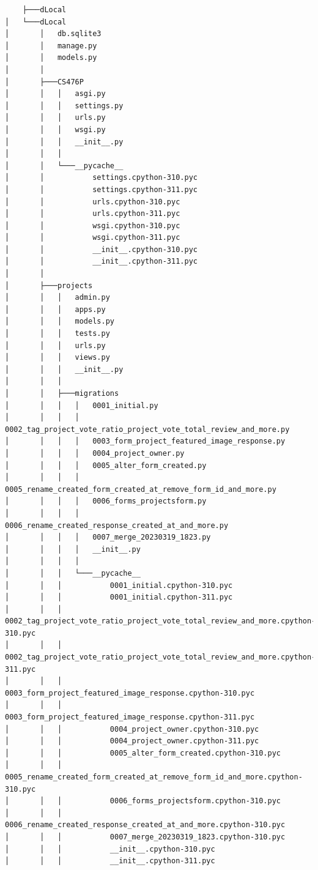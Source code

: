 \documentclass[letterpaper, 12 pt, conference]{ieeeconf}
\begin{document}
\singlespacing
\begin{lstlisting}
    ├───dLocal
│   └───dLocal
│       │   db.sqlite3
│       │   manage.py
│       │   models.py
│       │
│       ├───CS476P
│       │   │   asgi.py
│       │   │   settings.py
│       │   │   urls.py
│       │   │   wsgi.py
│       │   │   __init__.py
│       │   │
│       │   └───__pycache__
│       │           settings.cpython-310.pyc
│       │           settings.cpython-311.pyc
│       │           urls.cpython-310.pyc
│       │           urls.cpython-311.pyc
│       │           wsgi.cpython-310.pyc
│       │           wsgi.cpython-311.pyc
│       │           __init__.cpython-310.pyc
│       │           __init__.cpython-311.pyc
│       │
│       ├───projects
│       │   │   admin.py
│       │   │   apps.py
│       │   │   models.py
│       │   │   tests.py
│       │   │   urls.py
│       │   │   views.py
│       │   │   __init__.py
│       │   │
│       │   ├───migrations
│       │   │   │   0001_initial.py
│       │   │   │   0002_tag_project_vote_ratio_project_vote_total_review_and_more.py
│       │   │   │   0003_form_project_featured_image_response.py
│       │   │   │   0004_project_owner.py
│       │   │   │   0005_alter_form_created.py
│       │   │   │   0005_rename_created_form_created_at_remove_form_id_and_more.py
│       │   │   │   0006_forms_projectsform.py
│       │   │   │   0006_rename_created_response_created_at_and_more.py
│       │   │   │   0007_merge_20230319_1823.py
│       │   │   │   __init__.py
│       │   │   │
│       │   │   └───__pycache__
│       │   │           0001_initial.cpython-310.pyc
│       │   │           0001_initial.cpython-311.pyc
│       │   │           0002_tag_project_vote_ratio_project_vote_total_review_and_more.cpython-310.pyc
│       │   │           0002_tag_project_vote_ratio_project_vote_total_review_and_more.cpython-311.pyc
│       │   │           0003_form_project_featured_image_response.cpython-310.pyc
│       │   │           0003_form_project_featured_image_response.cpython-311.pyc
│       │   │           0004_project_owner.cpython-310.pyc
│       │   │           0004_project_owner.cpython-311.pyc
│       │   │           0005_alter_form_created.cpython-310.pyc
│       │   │           0005_rename_created_form_created_at_remove_form_id_and_more.cpython-310.pyc
│       │   │           0006_forms_projectsform.cpython-310.pyc
│       │   │           0006_rename_created_response_created_at_and_more.cpython-310.pyc
│       │   │           0007_merge_20230319_1823.cpython-310.pyc
│       │   │           __init__.cpython-310.pyc
│       │   │           __init__.cpython-311.pyc

\end{lstlisting}
\end{document}
